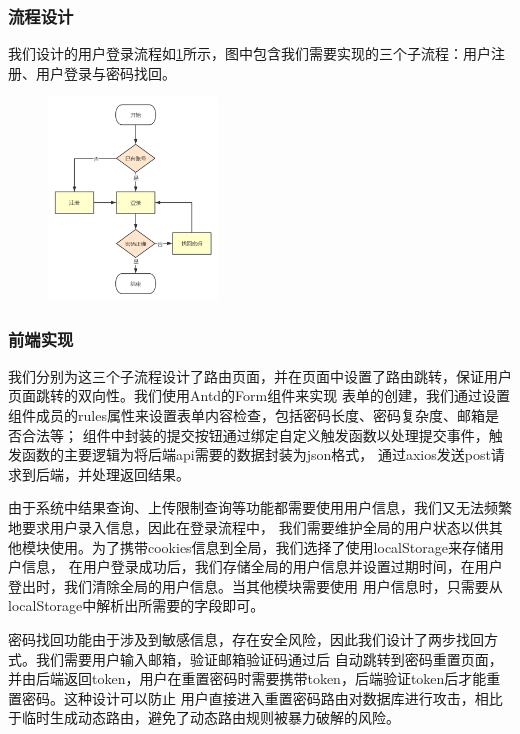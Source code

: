 \subsubsection{流程设计}

我们设计的用户登录流程如\ref{fig:login-process}所示，图中包含我们需要实现的三个子流程：用户注册、用户登录与密码找回。
\begin{figure}[ht]
    \centering
    \includegraphics[width=0.4\textwidth]{source/img/login_process.png}
    \label{fig:login-process}
\end{figure}

\subsubsection{前端实现}

我们分别为这三个子流程设计了路由页面，并在页面中设置了路由跳转，保证用户页面跳转的双向性。我们使用Antd的Form组件来实现
表单的创建，我们通过设置组件成员的rules属性来设置表单内容检查，包括密码长度、密码复杂度、邮箱是否合法等；
组件中封装的提交按钮通过绑定自定义触发函数以处理提交事件，触发函数的主要逻辑为将后端api需要的数据封装为json格式，
通过axios发送post请求到后端，并处理返回结果。

由于系统中结果查询、上传限制查询等功能都需要使用用户信息，我们又无法频繁地要求用户录入信息，因此在登录流程中，
我们需要维护全局的用户状态以供其他模块使用。为了携带cookies信息到全局，我们选择了使用localStorage来存储用户信息，
在用户登录成功后，我们存储全局的用户信息并设置过期时间，在用户登出时，我们清除全局的用户信息。当其他模块需要使用
用户信息时，只需要从localStorage中解析出所需要的字段即可。

密码找回功能由于涉及到敏感信息，存在安全风险，因此我们设计了两步找回方式。我们需要用户输入邮箱，验证邮箱验证码通过后
自动跳转到密码重置页面，并由后端返回token，用户在重置密码时需要携带token，后端验证token后才能重置密码。这种设计可以防止
用户直接进入重置密码路由对数据库进行攻击，相比于临时生成动态路由，避免了动态路由规则被暴力破解的风险。


